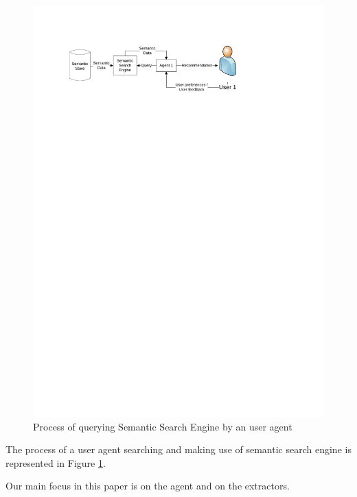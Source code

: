 \documentclass{www2009-submission}
\begin{document}
\begin{figure}
\centering
\includegraphics[width=\hsize]{img/UserSearch}
\caption{Process of querying Semantic Search Engine by an user agent}
\label{img:UserSearch}
\end{figure}
 
The process of a user agent searching and making use of semantic search engine is represented in Figure \ref{img:UserSearch}.

Our main focus in this paper is on the agent and on the extractors.
\end{document}
